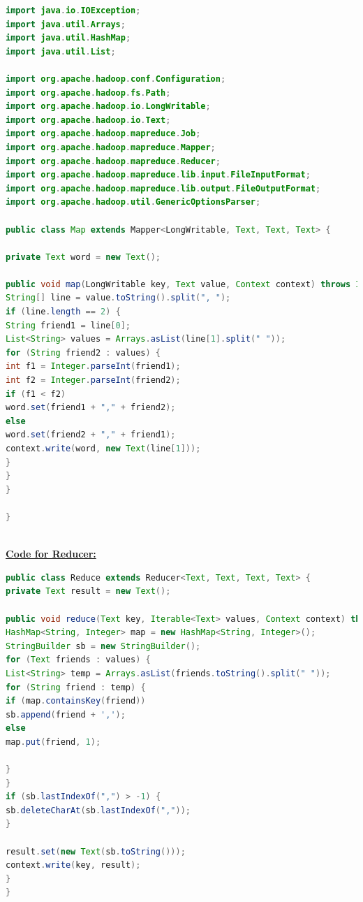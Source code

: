 \documentclass[11pt,article]{memoir}
\begin{document}
\begin{flushleft}
\begin{lstlisting}[language=java]
import java.io.IOException;
import java.util.Arrays;
import java.util.HashMap;
import java.util.List;

import org.apache.hadoop.conf.Configuration;
import org.apache.hadoop.fs.Path;
import org.apache.hadoop.io.LongWritable;
import org.apache.hadoop.io.Text;
import org.apache.hadoop.mapreduce.Job;
import org.apache.hadoop.mapreduce.Mapper;
import org.apache.hadoop.mapreduce.Reducer;
import org.apache.hadoop.mapreduce.lib.input.FileInputFormat;
import org.apache.hadoop.mapreduce.lib.output.FileOutputFormat;
import org.apache.hadoop.util.GenericOptionsParser;

public class Map extends Mapper<LongWritable, Text, Text, Text> {

private Text word = new Text();

public void map(LongWritable key, Text value, Context context) throws IOException, InterruptedException {
String[] line = value.toString().split(", ");
if (line.length == 2) {
String friend1 = line[0];
List<String> values = Arrays.asList(line[1].split(" "));
for (String friend2 : values) {
int f1 = Integer.parseInt(friend1);
int f2 = Integer.parseInt(friend2);
if (f1 < f2)
word.set(friend1 + "," + friend2);
else
word.set(friend2 + "," + friend1);
context.write(word, new Text(line[1]));
}
}
}

}
	
\end{lstlisting}
\newpage
\textbf{\underline{Code for Reducer:}}
\begin{lstlisting}[language=java]
public class Reduce extends Reducer<Text, Text, Text, Text> {
private Text result = new Text();

public void reduce(Text key, Iterable<Text> values, Context context) throws IOException, InterruptedException {
HashMap<String, Integer> map = new HashMap<String, Integer>();
StringBuilder sb = new StringBuilder();
for (Text friends : values) {
List<String> temp = Arrays.asList(friends.toString().split(" "));
for (String friend : temp) {
if (map.containsKey(friend))
sb.append(friend + ',');
else
map.put(friend, 1);

}
}
if (sb.lastIndexOf(",") > -1) {
sb.deleteCharAt(sb.lastIndexOf(","));
}

result.set(new Text(sb.toString()));
context.write(key, result);
}
}




\end{lstlisting}


\end{flushleft}
\end{document}
